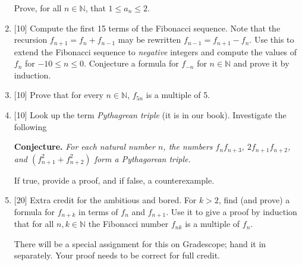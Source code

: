 \documentclass[12pt]{article}
\newcommand{\defn}[1]{{\color{blue}\sl #1}}
\newcommand{\NN}{{\mathbb N}}
\begin{document}
\begin{enumerate}
   Prove, for all $n\in\NN$, that $1\leq a_n\leq 2$.

\item{[10]}  Compute the first 15 terms of the Fibonacci sequence.
           Note that the recursion $f_{n+1}=f_{n}+f_{n-1}$ may be rewritten $f_{n-1}=f_{n+1}-f_n$.
           Use this to extend the Fibonacci sequence to {\sl negative} integers and compute the values of $f_n$ for
           $-10\leq n \leq 0$.
           Conjecture a formula for $f_{-n}$ for $n\in\NN$ and prove it by induction.

\item{[10]} Prove that for every $n\in\NN$,   $f_{5n}$ is a multiple of 5.

\item{[10]} Look up the term \defn{Pythagrean triple} (it is in our book).
    Investigate the following\medskip

  {\bf Conjecture.}  {\sl For each natural number $n$, the numbers $f_nf_{n+3}$,
  $2f_{n+1}f_{n+2}$, and $(f_{n+1}^2+f_{n+2}^2)$ form a {\color{Blue}Pythagorean triple}.}\medskip

   If true, provide a proof, and if false, a counterexample.



\item{[20]} {\color{Magenta}Extra credit for the ambitious and bored.}
          For $k>2$, find (and prove) a formula for $f_{n+k}$ in terms of $f_n$ and $f_{n+1}$.
          Use it to give a proof by induction that for all $n,k\in\NN$ the
          Fibonacci number $f_{nk}$ is a multiple of $f_n$.

         {\color{Magenta}There will be a special assignment for this on Gradescope; hand it in separately.
         Your proof needs to be correct for full credit.}


\end{enumerate}
\end{document}
